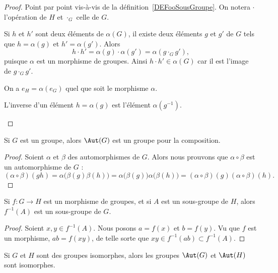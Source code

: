 \begin{proof}
	Point par point vis-à-vis de la définition~\ref{DEFooSousGroupe}. On notera \( \cdot \) l'opération de \( H \) et \( \cdot_G \) celle de \( G \).
	\begin{subproof}
		Si \( h \) et \( h' \) sont deux éléments de \( \alpha(G)\), il existe deux éléments \( g \) et \( g'\) de \( G \) tels que \( h = \alpha(g) \) et \( h' = \alpha(g') \). Alors
		\[
			h \cdot h' = \alpha(g) \cdot \alpha(g') = \alpha(g\cdot_G g'),
		\]
		puisque \( \alpha \) est un morphisme de groupes. Ainsi \( h \cdot h' \in \alpha(G) \) car il est l'image de \( g\cdot_G g' \).

		\spitem[Neutre]
		On a \( e_H = \alpha(e_G) \) quel que soit le morphisme \( \alpha \).

		\spitem[Inverse]
		L'inverse d'un élément \( h = \alpha(g) \) est l'élément \( \alpha(g^{-1}) \).
	\end{subproof}
\end{proof}

\begin{lemma}       \label{LEMooKJMWooQeIwgF}
	Si \( G\) est un groupe, alors \( \Aut(G)\) est un groupe pour la composition.
\end{lemma}

\begin{proof}
	Soient \( \alpha\) et \( \beta\) des automorphismes de \( G\). Alors nous prouvons que \( \alpha\circ\beta\) est un automorphisme de \( G\) :
	\begin{equation}
		(\alpha\circ\beta)(gh)=\alpha\big( \beta(g)\beta(h) \big)=\alpha\big( \beta(g) \big)\alpha\big( \beta(h) \big)=(\alpha\circ\beta)(g)(\alpha\circ\beta)(h).
	\end{equation}
\end{proof}

\begin{proposition}	\label{PROPooWTLOooQmomoU}
	Si \(f \colon G\to H  \) est un morphisme de groupes, et si \( A\) est un sous-groupe de \( H\), alors \( f^{-1}(A)\) est un sous-groupe de \( G\).
\end{proposition}

\begin{proof}
	Soient \( x,y\in f^{-1}(A)\). Nous posons \( a=f(x)\) et \( b=f(y)\). Vu que \( f\) est un morphisme, \( ab=f(xy)\), de telle sorte que \( xy\in f^{-1}(ab)\subset f^{-1}(A)\).
\end{proof}

\begin{lemma}       \label{LEMooDPISooRoAFmt}
	Si \( G\) et \( H\) sont des groupes isomorphes, alors les groupes \( \Aut(G)\) et \( \Aut(H)\) sont isomorphes.
\end{lemma}

